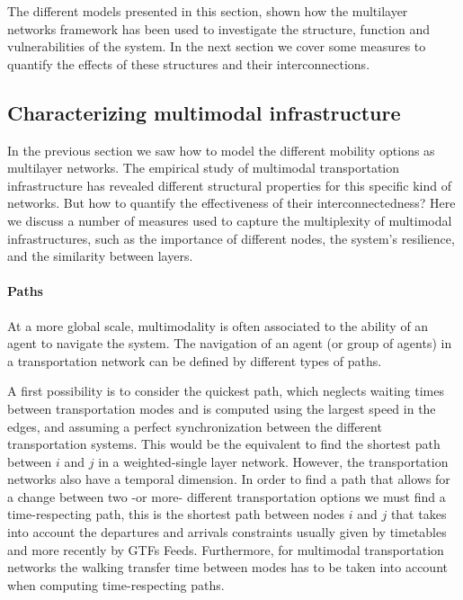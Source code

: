 The different models presented in this section, shown how the multilayer networks framework has been used to investigate the structure, function and vulnerabilities of the system. In the next section we cover some measures to quantify the effects of these structures and their interconnections.

\subsection{Characterizing multimodal infrastructure}\label{sec:measuresinfrastructure}

In the previous section we saw how to model the different mobility options as multilayer networks. The empirical study of multimodal transportation infrastructure has revealed different structural properties for this specific kind of networks. But how to quantify the effectiveness of their interconnectedness? Here we discuss a number of measures used to capture the multiplexity of multimodal infrastructures, such as the importance of different nodes, the system's resilience, and the similarity between layers.

\paragraph*{Paths} 
At a more global scale, multimodality is often associated to the ability of an agent to navigate the system. The navigation of an agent (or group of agents) in a transportation network can be defined by different types of paths.

A first possibility is to consider the quickest path, which neglects waiting times between transportation modes and is computed using the largest speed in the edges, and assuming a perfect synchronization between the different transportation systems. This would be the equivalent to find the shortest path between $i$ and $j$ in a weighted-single layer network. However, the transportation networks also have a temporal dimension. In order to find a path that allows for a change between two -or more- different transportation options we must find a time-respecting path, this is the shortest path between nodes $i$ and $j$ that takes into account the departures and arrivals constraints usually given by timetables and more recently by GTFs Feeds. Furthermore, for multimodal transportation networks the walking transfer time between modes has to be taken into account when computing time-respecting paths.

